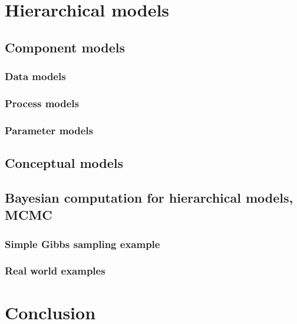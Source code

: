 \section{Hierarchical models}
\label{wikle:hier}

\subsection{Component models}
\label{wikle:hier:component}

\subsubsection{Data models}
\label{wikle:hier:component:data}

\subsubsection{Process models}
\label{wikle:hier:component:process}

\subsubsection{Parameter models}
\label{wikle:hier:component:parameter}

\subsection{Conceptual models}
\label{wikle:hier:conceptual}

\subsection{Bayesian computation for hierarchical models, MCMC}
\label{wikle:hier:mcmc}

\subsubsection{Simple Gibbs sampling example}
\label{wikle:hier:mcmc:gibbs}

\subsubsection{Real world examples}
\label{wikle:hier:mcmc:real}

\section{Conclusion}
\label{wikle:conclusion}

